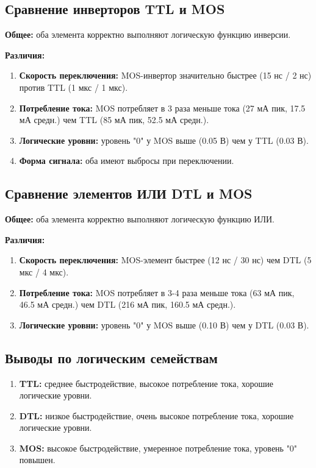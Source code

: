 \subsection{Сравнение инверторов TTL и MOS}

\textbf{Общее:} оба элемента корректно выполняют логическую функцию инверсии.

\textbf{Различия:}
\begin{enumerate}
    \item \textbf{Скорость переключения:} MOS-инвертор значительно быстрее (15 нс / 2 нс) против TTL (1 мкс / 1 мкс).
    \item \textbf{Потребление тока:} MOS потребляет в 3 раза меньше тока (27 мА пик, 17.5 мА средн.) чем TTL (85 мА пик, 52.5 мА средн.).
    \item \textbf{Логические уровни:} уровень "0" у MOS выше (0.05 В) чем у TTL (0.03 В).
    \item \textbf{Форма сигнала:} оба имеют выбросы при переключении.
\end{enumerate}

\subsection{Сравнение элементов ИЛИ DTL и MOS}

\textbf{Общее:} оба элемента корректно выполняют логическую функцию ИЛИ.

\textbf{Различия:}
\begin{enumerate}
    \item \textbf{Скорость переключения:} MOS-элемент быстрее (12 нс / 30 нс) чем DTL (5 мкс / 4 мкс).
    \item \textbf{Потребление тока:} MOS потребляет в 3-4 раза меньше тока (63 мА пик, 46.5 мА средн.) чем DTL (216 мА пик, 160.5 мА средн.).
    \item \textbf{Логические уровни:} уровень "0" у MOS выше (0.10 В) чем у DTL (0.03 В).
\end{enumerate}

\subsection{Выводы по логическим семействам}

\begin{enumerate}
    \item \textbf{TTL:} среднее быстродействие, высокое потребление тока, хорошие логические уровни.
    \item \textbf{DTL:} низкое быстродействие, очень высокое потребление тока, хорошие логические уровни.
    \item \textbf{MOS:} высокое быстродействие, умеренное потребление тока, уровень "0" повышен.
\end{enumerate}

